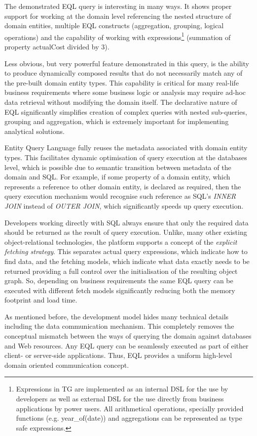   The demonstrated EQL query is interesting in many ways.
  It shows proper support for working at the domain level referencing the nested structure of domain entities, multiple EQL constructs (aggregation, grouping, logical operations) and the capability of working with expressions\footnote{
    Expressions in TG are implemented as an internal DSL for the use by developers as well as external DSL for the use directly from business applications by power users. 
    All arithmetical operations, specially provided functions (e.g. year\_of(date)) and aggregations can be represented as type safe expressions.
  }
  (summation of property actualCost divided by 3).  
  
  Less obvious, but very powerful feature demonstrated in this query, is the ability to produce dynamically composed results that do not necessarily match any of the pre-built domain entity types.
  This capability is critical for many real-life business requirements where some business logic or analysis may require ad-hoc data retrieval without modifying the domain itself.
  The declarative nature of EQL significantly simplifies creation of complex queries with nested sub-queries, grouping and aggregation, which is extremely important for implementing analytical solutions.  

  Entity Query Language fully reuses the metadata associated with domain entity types.
  This facilitates dynamic optimisation of query execution at the databases level, which is possible due to semantic transition between metadata of the domain and SQL.
  For example, if some property of a domain entity, which represents a reference to other domain entity, is declared as required, then the query execution mechanism would recognise such reference as SQL's \emph{INNER JOIN} instead of \emph{OUTER JOIN}, which significantly speeds up query execution.

  Developers working directly with SQL always ensure that only the required data should be returned as the result of query execution.  
  Unlike, many other existing object-relational technologies, the platform supports a concept of the \emph{explicit fetching strategy}.
  This separates actual query expressions, which indicate how to find data, and the fetching models, which indicate what data exactly needs to be returned providing a full control over the initialisation of the resulting object graph.
  So, depending on business requirements the same EQL query can be executed with different fetch models significantly reducing both the memory footprint and load time.  

  As mentioned before, the development model hides many technical details including the data communication mechanism.
  This completely removes the conceptual mismatch between the ways of querying the domain against databases and Web resources.
  Any EQL query can be seamlessly executed as part of either client- or server-side applications.
  Thus, EQL provides a uniform high-level domain oriented communication concept.